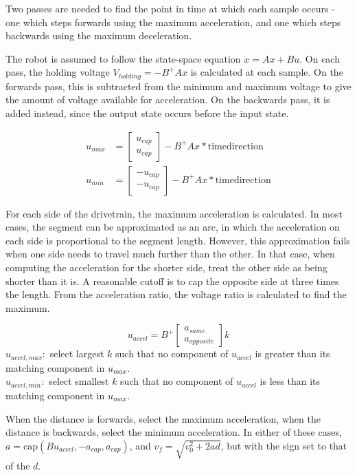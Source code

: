 \documentclass{article}
\begin{document}
Two passes are needed to find the point in time at which each sample occurs - one which steps
forwards using the maximum acceleration, and one which steps backwards using the maximum
deceleration.

The robot is assumed to follow the state-space equation $\dot{x}=Ax+Bu$. On each pass,
the holding voltage $V_{holding}=-B^+Ax$ is calculated at each sample. On the forwards
pass, this is subtracted from the minimum and maximum voltage to give the amount of voltage
available for acceleration. On the backwards pass, it is added instead, since the output
state occurs before the input state.

\begin{align}
u_{max} &= \begin{bmatrix}  u_{cap} \\  u_{cap} \end{bmatrix} - B^+Ax * \mathrm{time direction} \\
u_{min} &= \begin{bmatrix} -u_{cap} \\ -u_{cap} \end{bmatrix} - B^+Ax * \mathrm{time direction}
\end{align}

For each side of the drivetrain, the maximum acceleration is calculated. In most cases,
the segment can be approximated as an arc, in which the acceleration on each side is
proportional to the segment length. However, this approximation fails when one side needs
to travel much further than the other. In that case, when computing the acceleration
for the shorter side, treat the other side as being shorter than it is. A reasonable cutoff
is to cap the opposite side at three times the length. From the acceleration ratio, the
voltage ratio is calculated to find the maximum.

\begin{equation}
u_{accel} = B^+ \begin{bmatrix} a_{same} \\ a_{opposite} \end{bmatrix}k
\end{equation}
$u_{accel,max}:$ select largest $k$ such that no component of $u_{accel}$ is greater than its matching component in $u_{max}$. \\
$u_{accel,min}:$ select smallest $k$ such that no component of $u_{accel}$ is less than its matching component in $u_{max}$.

When the distance is forwards, select the maximum acceleration, when the distance is backwards,
select the minimum acceleration. In either of these cases,
$a = \mathrm{cap}(Bu_{accel}, -a_{cap}, a_{cap})$, and
$v_f = \sqrt{v_0^2+2ad}$, but with the sign set to that of the $d$.
\end{document}
